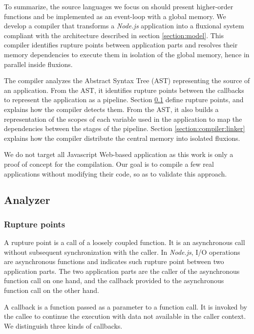 To summarize, the source languages we focus on should present higher-order functions and be implemented as an event-loop with a global memory.
We develop a compiler that transforms a \textit{Node.js} application into a fluxional system compliant with the architecture described in section \ref{section:model}.
This compiler identifies rupture points between application parts and resolves their memory dependencies to execute them in isolation of the global memory, hence in parallel inside fluxions.

The compiler analyzes the Abstract Syntax Tree (AST) representing the source of an application.
From the AST, it identifies rupture points between the callbacks to represent the application as a pipeline.
Section \ref{section:compiler:analyzer} define rupture points, and explains how the compiler detects them.
From the AST, it also builds a representation of the scopes of each variable used in the application to map the dependencies between the stages of the pipeline.
Section \ref{section:compiler:linker} explains how the compiler distribute the central memory into isolated fluxions.

We do not target all Javascript Web-based application as this work is only a proof of concept for the compilation.
Our goal is to compile a few real applications without modifying their code, so as to validate this approach.

\subsection{Analyzer} \label{section:compiler:analyzer}

\subsubsection{Rupture points} \label{section:compiler:analyzer:rupture}

A rupture point is a call of a loosely coupled function.
It is an asynchronous call without subsequent synchronization with the caller.
In \textit{Node.js}, I/O operations are asynchronous functions and indicates such rupture point between two application parts.
The two application parts are the caller of the asynchronous function call on one hand, and the callback provided to the asynchronous function call on the other hand.

A callback is a function passed as a parameter to a function call.
It is invoked by the callee to continue the execution with data not available in the caller context.
We distinguish three kinds of callbacks.

